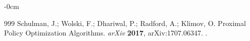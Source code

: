 \documentclass[mca,article,accept,pdftex,oneauthor]{Definitions/mdpi}
\begin{document}
\begin{adjustwidth}{-\extralength}{0cm}
\begin{thebibliography}{999}
Schulman, J.; Wolski, F.; Dhariwal, P.; Radford, A.; Klimov, O.
\newblock Proximal Policy Optimization Algorithms.
\newblock \emph{arXiv} \textbf{2017}, arXiv:1707.06347.
.

\end{thebibliography}




%


\PublishersNote{}
\end{adjustwidth}
\end{document}
